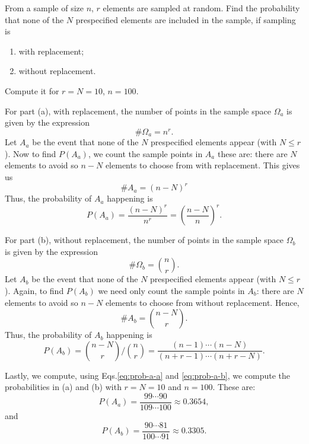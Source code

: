 \begin{problem}
  From a sample of size \(n\), \(r\) elements are sampled at random. Find
  the probability that none of the \(N\) prespecified elements are included
  in the sample, if sampling is
  \begin{enumerate}[label=(\alph*)]
  \item with replacement;
  \item without replacement.
  \end{enumerate}
  Compute it for \(r=N=10\), \(n=100\).
\end{problem}
\begin{solution}
  For part (a), with replacement, the number of points in the sample space
  \(\Omega_a\) is given by the expression
  \[
    \#\Omega_a=n^r.
  \]
  Let \(A_a\) be the event that none of the \(N\) prespecified elements
  appear (with \(N\leq r\)). Now to find \(P(A_a)\), we count the sample
  points in \(A_a\) these are: there are \(N\) elements to avoid so \(n-N\)
  elements to choose from with replacement. This gives us
  \[
    \# A_a=(n-N)^r
  \]
  Thus, the probability of \(A_a\) happening is
  \begin{equation}
    \label{eq:prob-a-a}
    P(A_a)=\frac{(n-N)^r}{n^r}=\left(\frac{n-N}{n}\right)^r.
  \end{equation}

  For part (b), without replacement, the number of points in the sample
  space \(\Omega_b\) is given by the expression
  \[
    \#\Omega_b=\binom{n}{r}.
  \]
  Let \(A_b\) be the event that none of the \(N\) prespecified elements
  appear (with \(N\leq r\)). Again, to find \(P(A_b)\) we need only count
  the sample points in \(A_b\): there are \(N\) elements to avoid so
  \(n-N\) elements to choose from without replacement. Hence,
  \[
    \# A_b=\binom{n-N}{r}.
  \]
  Thus, the probability of \(A_b\) happening is
  \begin{equation}
    \label{eq:prob-a-b}
    P(A_b)=%
    \binom{n-N}{r}\biggl/\binom{n}{r}=%
    \frac{(n-1)\dotsm (n-N)}{(n+r-1)\dotsm (n+r-N)}.
  \end{equation}

  Lastly, we compute, using Eqs.\@ \eqref{eq:prob-a-a} and
  \eqref{eq:prob-a-b}, we compute the probabilities in (a) and (b) with
  \(r=N=10\) and \(n=100\). These are:
  \[
    P(A_a)=\frac{99\dotsm 90}{109\dotsm 100}\approx 0.3654,
  \]
  and
  \[
    P(A_b)=\frac{90\dotsm 81}{100\dotsm 91}\approx 0.3305.
  \]
\end{solution}
\newpage

